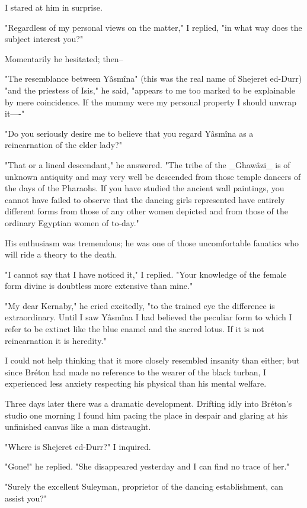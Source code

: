 I stared at him in surprise.

"Regardless of my personal views on the matter," I replied, "in what
way does the subject interest you?"

Momentarily he hesitated; then--

"The resemblance between Yâsmîna" (this was the real name of Shejeret
ed-Durr) "and the priestess of Isis," he said, "appears to me too
marked to be explainable by mere coincidence. If the mummy were my
personal property I should unwrap it----"

"Do you seriously desire me to believe that you regard Yâsmîna as a
reincarnation of the elder lady?"

"That or a lineal descendant," he answered. "The tribe of the
_Ghawâzi_ is of unknown antiquity and may very well be descended from
those temple dancers of the days of the Pharaohs. If you have studied
the ancient wall paintings, you cannot have failed to observe that the
dancing girls represented have entirely different forms from those of
any other women depicted and from those of the ordinary Egyptian women
of to-day."

His enthusiasm was tremendous; he was one of those uncomfortable
fanatics who will ride a theory to the death.

"I cannot say that I have noticed it," I replied. "Your knowledge
of the female form divine is doubtless more extensive than mine."

"My dear Kernaby," he cried excitedly, "to the trained eye the
difference is extraordinary. Until I saw Yâsmîna I had believed the
peculiar form to which I refer to be extinct like the blue enamel and
the sacred lotus. If it is not reincarnation it is heredity."

I could not help thinking that it more closely resembled insanity than
either; but since Bréton had made no reference to the wearer of the
black turban, I experienced less anxiety respecting his physical than
his mental welfare.

Three days later there was a dramatic development. Drifting idly into
Bréton's studio one morning I found him pacing the place in despair
and glaring at his unfinished canvas like a man distraught.

"Where is Shejeret ed-Durr?" I inquired.

"Gone!" he replied. "She disappeared yesterday and I can find no trace
of her."

"Surely the excellent Suleyman, proprietor of the dancing
establishment, can assist you?"

